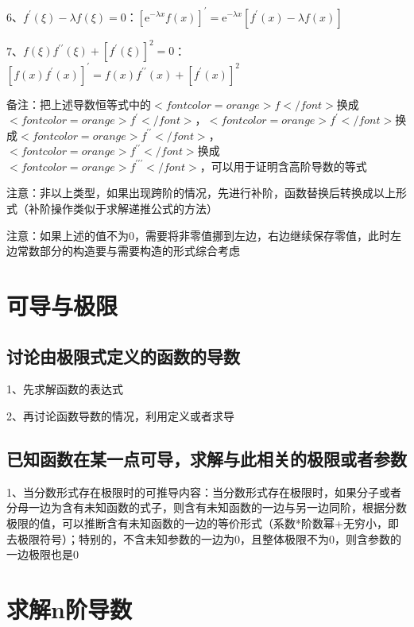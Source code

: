 6、$ f^{\prime}(\xi)-\lambda f(\xi)=0 $：$ \left[\mathrm{e}^{-\lambda x} f(x)\right]^{\prime}=\mathrm{e}^{-\lambda x}\left[f^{\prime}(x)-\lambda f(x)\right] $

7、$ f(\xi) f^{\prime \prime}(\xi)+\left[f^{\prime}(\xi)\right]^{2}=0 $：$ \left[f(x) f^{\prime}(x)\right]^{\prime}=f(x) f^{\prime \prime}(x)+\left[f^{\prime}(x)\right]^{2} $

备注：把上述导数恒等式中的$ <font color=orange>f</font> $换成$ <font color=orange>f^{\prime}</font> $，$ <font color=orange>f^{\prime}</font> $换成$ <font color=orange>f^{\prime \prime}</font> $，$ <font color=orange>f^{\prime \prime}</font> $换成$ <font color=orange>f^{\prime \prime \prime}</font> $，可以用于证明含高阶导数的等式

注意：非以上类型，如果出现跨阶的情况，先进行补阶，函数替换后转换成以上形式（补阶操作类似于求解递推公式的方法）

注意：如果上述的值不为0，需要将非零值挪到左边，右边继续保存零值，此时左边常数部分的构造要与需要构造的形式综合考虑

\section{可导与极限}



\subsection{讨论由极限式定义的函数的导数}

1、先求解函数的表达式

2、再讨论函数导数的情况，利用定义或者求导



\subsection{已知函数在某一点可导，求解与此相关的极限或者参数}

1、当分数形式存在极限时的可推导内容：当分数形式存在极限时，如果分子或者分母一边为含有未知函数的式子，则含有未知函数的一边与另一边同阶，根据分数极限的值，可以推断含有未知函数的一边的等价形式（系数*阶数幂+无穷小，即去极限符号）；特别的，不含未知参数的一边为0，且整体极限不为0，则含参数的一边极限也是0

\section{求解n阶导数}

